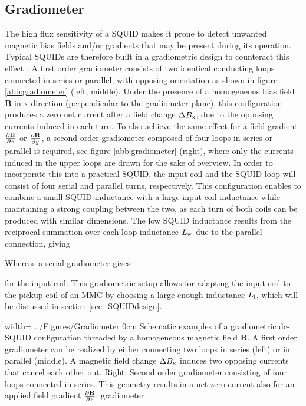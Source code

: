 \subsection{Gradiometer}

The high flux sensitivity of a SQUID makes it prone to detect unwanted magnetic bias fields and/or gradients that may be present during its operation. Typical SQUIDs are therefore built in a gradiometric design to counteract this effect \cite{Ketchen1978}. A first order gradiometer consists of two identical conducting loops connected in series or parallel, with opposing orientation as shown in figure \ref{abb:gradiometer} (left, middle). Under the presence of a homogeneous bias field $\textbf{B}$ in x-direction (perpendicular to the gradiometer plane), this configuration produces a zero net current after a field change $\Delta B_{\rm x}$, due to the opposing currents induced in each turn. To also achieve the same effect for a field gradient $\frac{\partial \textbf{B}}{\partial z}$ or $\frac{\partial \textbf{B}}{\partial y}$, a second order gradiometer composed of four loops in series or parallel is required, see figure \ref{abb:gradiometer} (right), where only the currents induced in the upper loops are drawn for the sake of overview. In order to incorporate this into a practical SQUID, the input coil and the SQUID loop will consist of four serial and parallel turns, respectively. This configuration enables to combine a small SQUID inductance with a large input coil inductance while maintaining a strong coupling between the two, as each turn of both coils can be produced with similar dimensions. The low SQUID inductance results from the reciprocal summation over each loop inductance $L_{\rm w}$ due to the parallel connection, giving


Whereas a serial gradiometer gives 


for the input coil. This gradiometric setup allows for adapting the input coil to the pickup coil of an MMC by choosing a large enough inductance $L_{\rm i}$, which will be discussed in section \ref{sec_SQUIDdesign}. 

{width=\textwidth}
{../Figures/Gradiometer}
{0cm}   %
{Schematic examples of a gradiometric dc-SQUID configuration threaded by a homogeneous magnetic field $\textbf{B}$. A first order gradiometer can be realized by either connecting two loops in series (left) or in parallel (middle). A magnetic field change $\Delta B_{\rm x}$ induces two opposing currents that cancel each other out. Right: Second order gradiometer consisting of four loops connected in series. This geometry results in a net zero current also for an applied field gradient $\frac{\partial \textbf{B}}{\partial z}$.}
{gradiometer}
   
